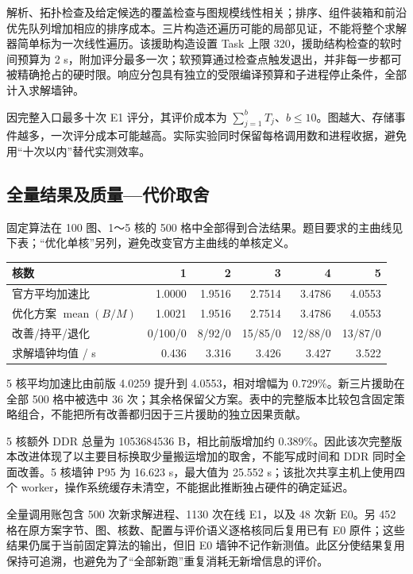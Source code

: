 \documentclass[anonymous,notoc]{gmcm2026}
\begin{document}
解析、拓扑检查及给定候选的覆盖检查与图规模线性相关；排序、组件装箱和前沿优先队列增加相应的排序成本。三片构造还遍历可能的局部见证，不能将整个求解器简单标为一次线性遍历。该援助构造设置 Task 上限 320，援助结构检查的软时间预算为 2 s，附加评分最多一次；软预算通过检查点触发退出，并非每一步都可被精确抢占的硬时限。响应分包具有独立的受限编译预算和子进程停止条件，全部计入求解墙钟。

因完整入口最多十次 E1 评分，其评价成本为 \(\sum_{j=1}^{b}T_j\)、\(b\le10\)。图越大、存储事件越多，一次评分成本可能越高。实际实验同时保留每格调用数和进程收据，避免用``十次以内''替代实测效率。

\subsection{全量结果及质量---代价取舍}\label{ux5168ux91cfux7ed3ux679cux53caux8d28ux91cfux4ee3ux4ef7ux53d6ux820d}

固定算法在 100 图、1～5 核的 500 格中全部得到合法结果。题目要求的主曲线见下表；``优化单核''另列，避免改变官方主曲线的单核定义。

\begin{table}[!htbp]\centering\small
\begin{tabularx}{\linewidth}{@{}Xrrrrr@{}}\toprule
核数 & 1 & 2 & 3 & 4 & 5 \\
\midrule
官方平均加速比 & 1.0000 & 1.9516 & 2.7514 & 3.4786 & 4.0553 \\
优化方案 $\operatorname{mean}(B/M)$ & 1.0021 & 1.9516 & 2.7514 & 3.4786 & 4.0553 \\
改善/持平/退化 & 0/100/0 & 8/92/0 & 15/85/0 & 12/88/0 & 13/87/0 \\
求解墙钟均值 / s & 0.436 & 3.316 & 3.426 & 3.427 & 3.522 \\
\bottomrule\end{tabularx}\end{table}

5 核平均加速比由前版 4.0259 提升到 4.0553，相对增幅为 0.729\%。新三片援助在全部 500 格中被选中 36 次；其余格保留父方案。表中的完整版本比较包含固定策略组合，不能把所有改善都归因于三片援助的独立因果贡献。

5 核额外 DDR 总量为 1053684536 B，相比前版增加约 0.389\%。因此该次完整版本改进体现了以主要目标换取少量搬运增加的取舍，不能写成时间和 DDR 同时全面改善。5 核墙钟 P95 为 16.623 s，最大值为 25.552 s；该批次共享主机上使用四个 worker，操作系统缓存未清空，不能据此推断独占硬件的确定延迟。

全量调用账包含 500 次新求解进程、1130 次在线 E1，以及 48 次新 E0。另 452 格在原方案字节、图、核数、配置与评价语义逐格核同后复用已有 E0 原件；这些结果仍属于当前固定算法的输出，但旧 E0 墙钟不记作新测值。此区分使结果复用保持可追溯，也避免为了``全部新跑''重复消耗无新增信息的评价。
\end{document}
